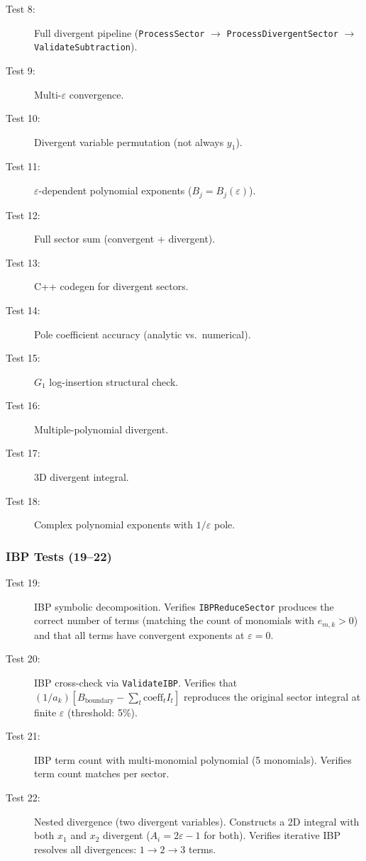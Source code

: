 \documentclass[11pt,a4paper]{article}
\begin{document}
\begin{description}
  \item[Test 8:] Full divergent pipeline (\texttt{ProcessSector} $\to$ \texttt{ProcessDivergentSector} $\to$ \texttt{ValidateSubtraction}).
  \item[Test 9:] Multi-$\varepsilon$ convergence.
  \item[Test 10:] Divergent variable permutation (not always $y_1$).
  \item[Test 11:] $\varepsilon$-dependent polynomial exponents ($B_j = B_j(\varepsilon)$).
  \item[Test 12:] Full sector sum (convergent + divergent).
  \item[Test 13:] C++ codegen for divergent sectors.
  \item[Test 14:] Pole coefficient accuracy (analytic vs.\ numerical).
  \item[Test 15:] $G_1$ log-insertion structural check.
  \item[Test 16:] Multiple-polynomial divergent.
  \item[Test 17:] 3D divergent integral.
  \item[Test 18:] Complex polynomial exponents with $1/\varepsilon$ pole.
\end{description}

\subsubsection*{IBP Tests (19--22)}

\begin{description}
  \item[Test 19:] IBP symbolic decomposition.  Verifies \texttt{IBPReduceSector} produces the correct number of terms (matching the count of monomials with $e_{m,k}>0$) and that all terms have convergent exponents at $\varepsilon=0$.
  \item[Test 20:] IBP cross-check via \texttt{ValidateIBP}.  Verifies that $(1/a_k)[B_{\mathrm{boundary}} - \sum_t \mathrm{coeff}_t I_t]$ reproduces the original sector integral at finite $\varepsilon$ (threshold: 5\%).
  \item[Test 21:] IBP term count with multi-monomial polynomial (5 monomials).  Verifies term count matches per sector.
  \item[Test 22:] Nested divergence (two divergent variables).  Constructs a 2D integral with both $x_1$ and $x_2$ divergent ($A_i = 2\varepsilon - 1$ for both).  Verifies iterative IBP resolves all divergences: $1\to 2\to 3$ terms.
\end{description}
\end{document}
